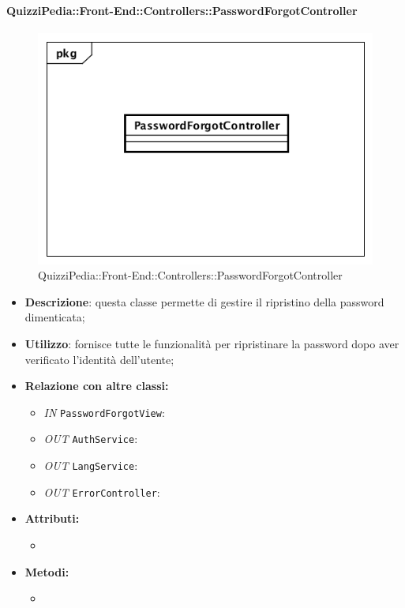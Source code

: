 \paragraph{QuizziPedia::Front-End::Controllers::PasswordForgotController}
\begin{figure}
	\centering
	\includegraphics[scale=0.45]{UML/Classi/Front-End/QuizziPedia_Front-end_Controller_PasswordForgotController.png}
	\caption{QuizziPedia::Front-End::Controllers::PasswordForgotController}
\end{figure}
\begin{itemize}
	\item \textbf{Descrizione}: questa classe permette di gestire il ripristino della password dimenticata;
	\item \textbf{Utilizzo}: fornisce tutte le funzionalità per ripristinare la password dopo aver verificato l'identità dell'utente;
	\item \textbf{Relazione con altre classi:}
	\begin{itemize}
		\item \textit{IN} \texttt{PasswordForgotView}: 
		\item \textit{OUT} \texttt{AuthService}: 
		\item \textit{OUT} \texttt{LangService}: 
		\item \textit{OUT} \texttt{ErrorController}: 
	\end{itemize}
	\item \textbf{Attributi:}
	\begin{itemize}
		\item 
	\end{itemize}
	\item \textbf{Metodi:}
	\begin{itemize}
		\item 
	\end{itemize}
\end{itemize}

